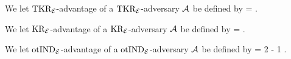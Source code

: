 \begin{figure}[p]
\end{figure}

We let $\textnormal{TKR}_{\cal E}$-advantage of a $\textnormal{TKR}_{\cal E}$-adversary ${\mathcal A}$ be defined by 
\bnm
  \AdvTKR{\cipher}{\advA} = \Prob{\TKR^\advA_\cipherE \Rightarrow\true}  \;.
\enm

\begin{figure}[p]
\end{figure}

We let $\textnormal{KR}_{\cal E}$-advantage of a $\textnormal{KR}_{\cal E}$-adversary ${\mathcal A}$ be defined by 
\bnm
  \AdvKR{\cipher}{\advA} = \Prob{\KR^\advA_\cipherE \Rightarrow\true}  \;.
\enm


\begin{figure}[p]
\end{figure}

We let $\textnormal{otIND}_{\cal E}$-advantage of a $\textnormal{otIND}_{\cal E}$-adversary ${\mathcal A}$ be defined by 
\bnm
  \AdvOTIND{\cipher}{\advA} = 2\cdotsm\Prob{\OTIND^\advA_\cipherE \Rightarrow\true} - 1  \;.
\enm

